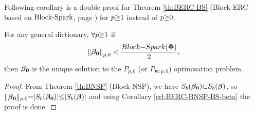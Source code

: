 Following corollary is a double proof for Theorem \ref{th:BERC-BS} (Block-ERC based on $\mathrm{Block\text{{-}}Spark}$, page \pageref{th:BERC-BS}) for $p {\geq} 1$ instead of $p {\geq} 0$.
\begin{corollary}
\label{crl:Double-proof-BERC-BS}
For any general dictionary, $\forall p {\geq} 1$ if 
\begin{equation*}
\left\lVert\boldsymbol{\beta_0}\right\rVert_{p,0} < \frac{Block{-}Spark(\boldsymbol{\Phi})}{2},
\end{equation*}
then $\boldsymbol{\beta_0}$ is the unique solution to the $P_{p,0}$ (or $P_{\boldsymbol{w};p,0}$) optimisation problem.
\end{corollary}
\begin{proof}
From Theorem \ref{th:BNSP} (Block-NSP), we have $S_b(\boldsymbol{\beta_0}) {\subset} S_b(\boldsymbol{\beta})$, so $\Vert \boldsymbol{\beta_0} \Vert_{p,0} {=} \vert S_b(\boldsymbol{\beta_0})\vert {\leq} \vert S_b(\boldsymbol{\beta}) \vert$ and using Corollary \ref{crl:BERC-BNSP-BS-beta} the proof is done. 
\end{proof}